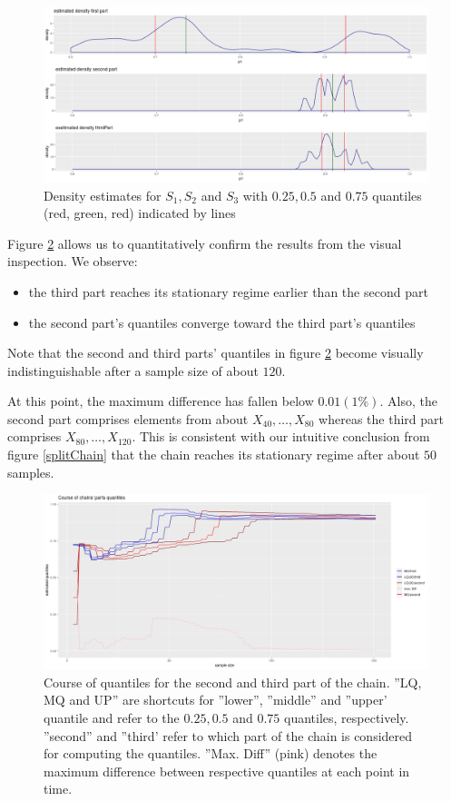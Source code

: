 \begin{figure}
	\includegraphics[width=\linewidth]{Images/chain_parts_quantiles.png}
	\caption{Density estimates for $S_1, S_2$ and $S_3$ with $0.25, 0.5$ and $ 0.75$ quantiles (red, green, red) indicated by lines}
	\label{splitChainDensities}
\end{figure}

Figure \ref{splitChainQuantileCourse} allows us to quantitatively confirm the results from the visual inspection. We observe:
\begin{itemize}
	\item the third part reaches its stationary regime earlier than the second part
	\item the second part's quantiles converge toward the third part's quantiles
\end{itemize}

Note that the second and third parts' quantiles in figure \ref{splitChainQuantileCourse} become visually indistinguishable after a sample size of about $120$. 

At this point, the maximum difference has fallen below $0.01 (1\%)$. 
Also, the second part comprises elements from about $X_{40}, \dots, X_{80}$ whereas the third part comprises $X_{80}, \dots, X_{120}$. This is consistent with our intuitive conclusion from figure \ref{splitChain} that the chain reaches its stationary regime after about $50$ samples. 

\begin{figure}
	\includegraphics[width=\linewidth]{Images/chain_part_quantiles.png}
	\caption{Course of quantiles for the second and third part of the chain. ''LQ, MQ and UP'' are shortcuts for ''lower'', ''middle'' and ''upper' quantile and refer to the $0.25, 0.5$ and $0.75$ quantiles, respectively. ''second'' and ''third' refer to which part of the chain is considered for computing the quantiles. ''Max. Diff'' (pink) denotes the maximum difference between respective quantiles at each point in time. }
	\label{splitChainQuantileCourse}
\end{figure}

